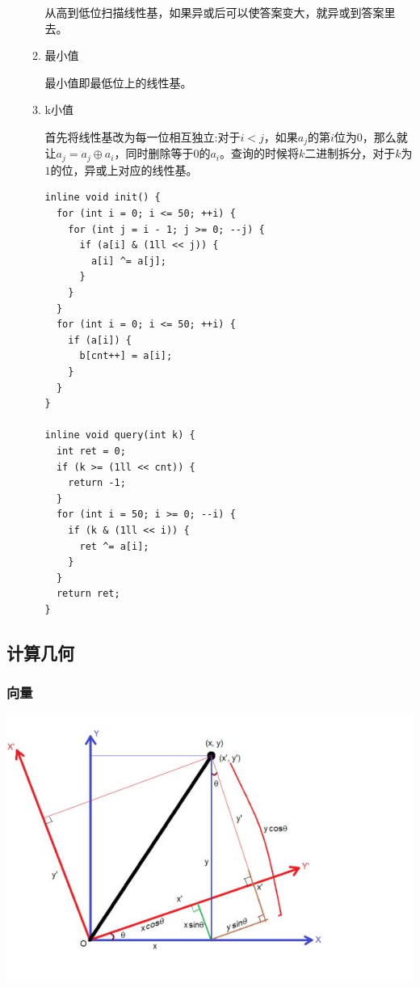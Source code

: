 \documentclass[11pt]{article}
\begin{document}
\begin{enumerate}
\begin{enumerate}
从高到低位扫描线性基，如果异或后可以使答案变大，就异或到答案里去。

\item 最小值
\label{sec:org9d27e9d}

最小值即最低位上的线性基。

\item k小值
\label{sec:orgb7b5281}

首先将线性基改为每一位相互独立:对于\(i < j\)，如果\(a_j\)的第\(i\)位为\(0\)，那么就让\(a_j=a_j \oplus a_i\)，同时删除等于\(0\)的\(a_i\)。查询的时候将\(k\)二进制拆分，对于\(k\)为\(1\)的位，异或上对应的线性基。

\begin{verbatim}
inline void init() {
  for (int i = 0; i <= 50; ++i) {
    for (int j = i - 1; j >= 0; --j) {
      if (a[i] & (1ll << j)) {
        a[i] ^= a[j];
      }
    }
  }
  for (int i = 0; i <= 50; ++i) {
    if (a[i]) {
      b[cnt++] = a[i];
    }
  }
}

inline void query(int k) {
  int ret = 0;
  if (k >= (1ll << cnt)) {
    return -1;
  }
  for (int i = 50; i >= 0; --i) {
    if (k & (1ll << i)) {
      ret ^= a[i];
    }
  }
  return ret;
}
\end{verbatim}
\end{enumerate}
\end{enumerate}
\subsection{计算几何}
\label{sec:org8599be8}
\subsubsection{向量}
\label{sec:org9d8e810}

\begin{center}
\includegraphics[width=.9\linewidth]{./Source/Picture/vector.png}
\end{center}
\end{document}
